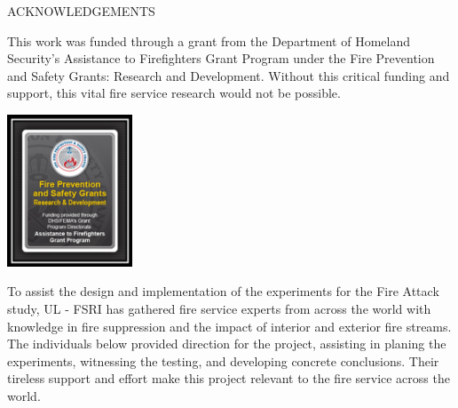 \documentclass{article}
\begin{document}
\begin{center}
	ACKNOWLEDGEMENTS
\vspace*{\baselineskip}
\begin{adjustwidth}{-0.25in}{-0.25in}
This work was funded through a grant from the Department of Homeland Security's Assistance to Firefighters Grant Program under the Fire Prevention and Safety Grants: Research and Development. Without this critical funding and support, this vital fire service research would not be possible.

\vspace*{\baselineskip}

\begin{center}
	\includegraphics[width=0.28\textwidth]{Figures/General/DHS}
\end{center}

\clearpage

To assist the design and implementation of the experiments for the Fire Attack study, UL - FSRI has gathered fire service experts from across the world with knowledge in fire suppression and the impact of interior and exterior fire streams. The individuals below provided direction for the project, assisting in planing the experiments, witnessing the testing, and developing concrete conclusions. Their tireless support and effort make this project relevant to the fire service across the world. 

\vspace*{\baselineskip}

\renewcommand{\arraystretch}{1.5}


\end{adjustwidth}
\end{center}
\end{document}
